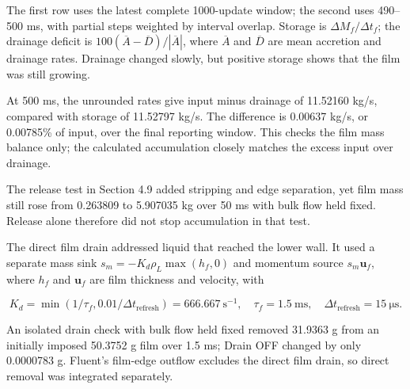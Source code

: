 \documentclass[12pt]{article}
\begin{document}
The first row uses the latest complete 1000-update window; the second uses 490--500 ms, with partial steps weighted by interval overlap. Storage is \(\Delta M_f/\Delta t_f\); the drainage deficit is \(100(\overline A-\overline D)/|\overline A|\), where \(\overline A\) and \(\overline D\) are mean accretion and drainage rates. Drainage changed slowly, but positive storage shows that the film was still growing.

At 500 ms, the unrounded rates give input minus drainage of 11.52160 kg/s, compared with storage of 11.52797 kg/s. The difference is 0.00637 kg/s, or 0.00785\% of input, over the final reporting window. This checks the film mass balance only; the calculated accumulation closely matches the excess input over drainage.

The release test in Section 4.9 added stripping and edge separation, yet film mass still rose from 0.263809 to 5.907035 kg over 50 ms with bulk flow held fixed. Release alone therefore did not stop accumulation in that test.

\par\noindent\begin{minipage}{\linewidth}
The direct film drain addressed liquid that reached the lower wall. It used a separate mass sink \(s_m=-K_d\rho_L\max(h_f,0)\) and momentum source \(s_m\boldsymbol u_f\), where \(h_f\) and \(\boldsymbol u_f\) are film thickness and velocity, with

\[
K_d=\min(1/\tau_f,0.01/\Delta t_{\mathrm{refresh}})=666.667\ \mathrm{s^{-1}},
\quad \tau_f=1.5\ \mathrm{ms},\quad\Delta t_{\mathrm{refresh}}=15\ \mathrm{\mu s}.
\tag{A4}
\]

An isolated drain check with bulk flow held fixed removed 31.9363 g from an initially imposed 50.3752 g film over 1.5 ms; Drain OFF changed by only 0.0000783 g. Fluent's film-edge outflow excludes the direct film drain, so direct removal was integrated separately.
\end{minipage}\par\medskip
\end{document}
